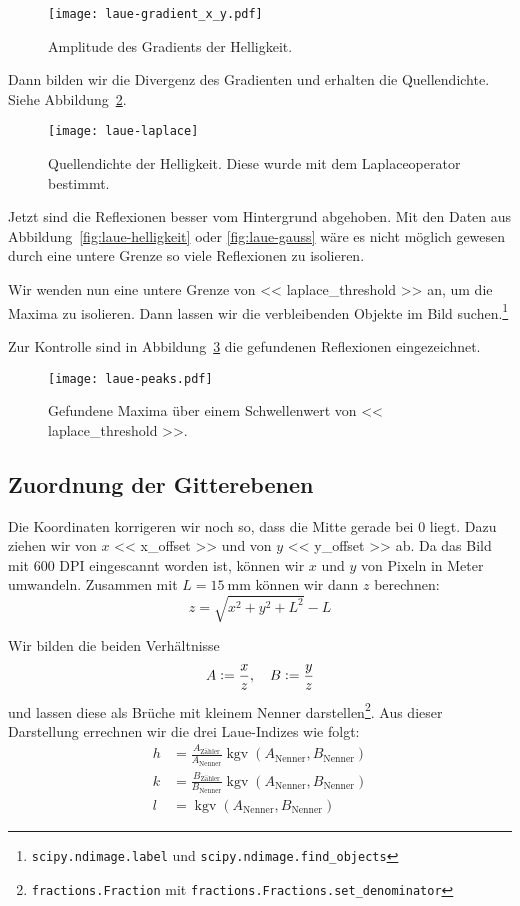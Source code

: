 \begin{figure}[htbp]
    \centering
    \texttt{[image: laue-gradient\_x\_y.pdf]}
    \caption{%
        Amplitude des Gradients der Helligkeit.
    }
    \label{fig:laue-gradient}
\end{figure}

Dann bilden wir die Divergenz des Gradienten und erhalten die Quellendichte.
Siehe Abbildung~\ref{fig:laue-laplace}.

\begin{figure}[htbp]
    \centering
    \texttt{[image: laue-laplace]}
    \caption{%
        Quellendichte der Helligkeit. Diese wurde mit dem Laplaceoperator
        bestimmt.
    }
    \label{fig:laue-laplace}
\end{figure}

Jetzt sind die Reflexionen besser vom Hintergrund abgehoben. Mit den Daten aus
Abbildung~\ref{fig:laue-helligkeit} oder \ref{fig:laue-gauss} wäre es nicht
möglich gewesen durch eine untere Grenze so viele Reflexionen zu isolieren.

Wir wenden nun eine untere Grenze von \num{<< laplace_threshold >>} an, um die
Maxima zu isolieren. Dann lassen wir die verbleibenden Objekte im Bild
suchen.\footnote{\texttt{scipy.ndimage.label} und
\texttt{scipy.ndimage.find\_objects}}

Zur Kontrolle sind in Abbildung~\ref{fig:laue-peaks} die gefundenen Reflexionen
eingezeichnet.

\begin{figure}[htbp]
    \centering
    \texttt{[image: laue-peaks.pdf]}
    \caption{%
        Gefundene Maxima über einem Schwellenwert von \num{<< laplace_threshold
        >>}.
    }
    \label{fig:laue-peaks}
\end{figure}

\subsection{Zuordnung der Gitterebenen}

Die Koordinaten korrigeren wir noch so, dass die Mitte gerade bei 0 liegt. Dazu
ziehen wir von $x$ \num{<< x_offset >>} und von $y$ \num{<< y_offset >>} ab. Da
das Bild mit 600 DPI eingescannt worden ist, können wir $x$ und $y$ von Pixeln
in Meter umwandeln. Zusammen mit $L = \SI{15}{\milli\meter}$ können wir dann
$z$ berechnen:
\[
    z = \sqrt{x^2 + y^2 + L^2} - L
\]

Wir bilden die beiden Verhältnisse
\[
    A := \frac xz
    ,\quad
    B := \frac yz
\]
und lassen diese als Brüche mit kleinem Nenner
darstellen\footnote{\texttt{fractions.Fraction} mit
\texttt{fractions.Fractions.set\_denominator}}. Aus dieser Darstellung
errechnen wir die drei Laue-Indizes wie folgt:
\begin{align*}
    h &= \frac{A_\text{Zähler}}{A_\text{Nenner}}
    \mathop{\mathrm{kgv}}(A_\text{Nenner}, B_\text{Nenner}) \\
    k &= \frac{B_\text{Zähler}}{B_\text{Nenner}}
    \mathop{\mathrm{kgv}}(A_\text{Nenner}, B_\text{Nenner}) \\
    l &= \mathop{\mathrm{kgv}}(A_\text{Nenner}, B_\text{Nenner})
\end{align*}

